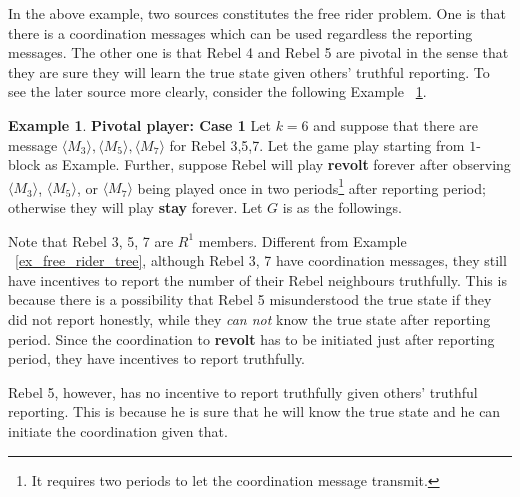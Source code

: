 \documentclass[12pt,letter]{article}
\theoremstyle{definition}
\newtheorem{example}{Example}[section]
\theoremstyle{remark}
\theoremstyle{claim}
\begin{document}
In the above example, two sources constitutes the free rider problem. One is that there is a coordination messages which can be used regardless the reporting messages. The other one is that Rebel 4 and Rebel 5 are pivotal in the sense that they are sure they will learn the true state given others' truthful reporting. To see the later source more clearly, consider the following Example ~\ref{ex_pivotal_1}.



\begin{example} \label{ex_pivotal_1}\textbf{Pivotal player: Case 1}
Let $k=6$ and suppose that there are message $\langle M_3 \rangle,\langle M_5 \rangle, \langle M_7 \rangle$ for Rebel 3,5,7. Let the game play starting from $1$-block as Example. Further, suppose Rebel will play \textbf{revolt} forever after observing $\langle M_3 \rangle$, $\langle M_5 \rangle$, or $\langle M_7 \rangle$ being played once in two periods\footnote{It requires two periods to let the coordination message transmit.} after reporting period; otherwise they will play \textbf{stay} forever. Let $G$ is as the followings.
\begin{center}
\end{center}

Note that Rebel 3, 5, 7 are $R^1$ members. Different from Example ~\ref{ex_free_rider_tree}, although Rebel 3, 7 have coordination messages, they still have incentives to report the number of their Rebel neighbours truthfully. This is because there is a possibility that Rebel 5 misunderstood the true state if they did not report honestly, while they \textit{can not} know the true state after reporting period. Since the coordination to \textbf{revolt} has to be initiated just after reporting period, they have incentives to report truthfully.

Rebel 5, however, has no incentive to report truthfully given others' truthful reporting. This is because he is sure that he will know the true state and he can initiate the coordination given that.
\end{example}
   
\end{document}
